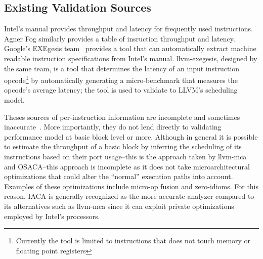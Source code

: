 \subsection{Existing Validation Sources}
Intel's manual\cite{intel-manual} provides throughput and latency for frequently used instructions.
Agner Fog\cite{agner} similarly provides a table of insruction throughput and latency.
Google's EXEgesis team~\cite{exegesis} provides a tool that can automatically extract
machine readable instruction specifications from Intel's manual.
llvm-exegesis, designed by the same team, is a tool that determines
the latency of an input instruction opcode\footnote{
Currently the tool is limited to instructions that does not touch memory or floating point registers} 
by automatically generating a micro-benchmark that measures the opcode's average latency;
the tool is used to validate to LLVM's scheduling model.

Theses sources of per-instruction information are incomplete and sometimes inaccurate~\cite{uops}. 
More importantly, they do not lend directly to validating performance model at basic block level or more.
Although in general it is possible to estimate the throughput of 
a basic block by inferring the scheduling of its instructions based on their
port usage--this is the approach taken by llvm-mca~\cite{llvm-mca} and OSACA\cite{osaca}--this
approach is incomplete as it does not take microarchitectural
optimizations that could alter the ``normal'' execution paths into account. 
Examples of these optimizations include micro-op fusion and zero-idioms.
For this reason, IACA\cite{iaca} is generally recognized as the more accurate analyzer
compared to its alternatives such as llvm-mca since it can exploit
private optimizations employed by Intel's processors.


